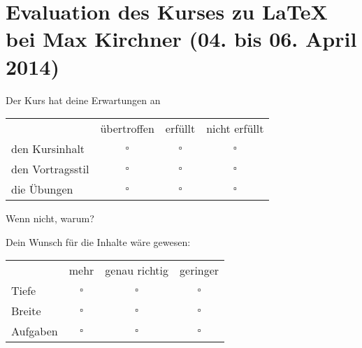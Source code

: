 
\usepackage{tikz}
\usepackage{wrapfig}
\usepackage{eurosym}

\hypersetup{
	pdftitle=
}

\title{}
\author{
	Martin Ueding \\
	\small{\href{mailto:mu@martin-ueding.de}{mu@martin-ueding.de}}
}

\pagestyle{empty}

\newcommand{\vorname}{Max}
\newcommand{\nachname}{Kirchner}
\newcommand{\datum}{04. bis 06. April 2014}

\newcommand{\sep}{\vspace{0.5cm}}




	\section*{
	Evaluation des Kurses zu \LaTeX{} \\
	bei \vorname{} \nachname{} (\datum)
}

Der Kurs hat deine Erwartungen an

\begin{tabular}{lccc}
	& übertroffen & erfüllt & nicht erfüllt \\
	den Kursinhalt & $\square$ & $\square$ & $\square$ \\
	den Vortragsstil & $\square$ & $\square$ & $\square$ \\
	die Übungen      & $\square$ & $\square$ & $\square$
\end{tabular}

Wenn nicht, warum?
\hrulefill

\hrulefill

\hrulefill

\sep

Dein Wunsch für die Inhalte wäre gewesen:

\begin{tabular}{lccc}
	& mehr & genau richtig & geringer \\
	Tiefe & $\square$ & $\square$ & $\square$ \\
	Breite & $\square$ & $\square$ & $\square$ \\
        Aufgaben & $\square$ & $\square$ & $\square$
\end{tabular}


